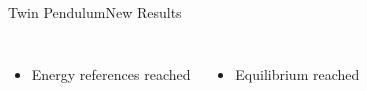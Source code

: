 \begin{frame}{Twin Pendulum}{New Results}
\begin{columns}[c]
  \end{columns}
  \begin{columns}[c]
    \begin{itemize}
      \item Energy references reached
    \end{itemize}
    \begin{itemize}\centering
      \item Equilibrium reached
    \end{itemize}
  \end{columns}
\end{frame}